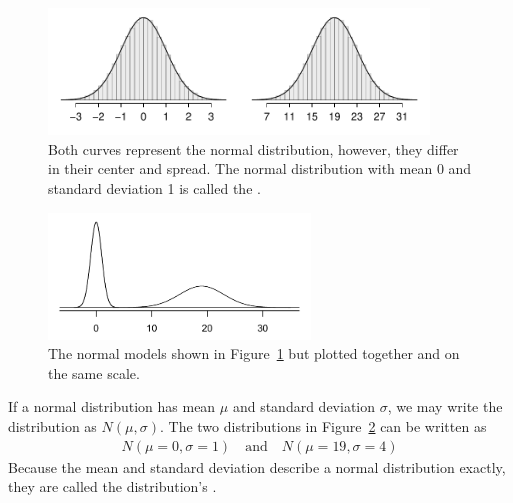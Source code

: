 \begin{figure}[H]
\centering
\includegraphics[width=0.9\textwidth]{03/figures/twoSampleNormals/twoSampleNormals}
\caption{Both curves represent the normal distribution, however, they differ in their center and spread. The normal distribution with mean 0 and standard deviation 1 is called the .}
\label{twoSampleNormals}
\end{figure}



\begin{figure}[H]
\centering
\includegraphics[width=0.62\textwidth]{03/figures/twoSampleNormalsStacked/twoSampleNormalsStacked}
\caption{The normal models shown in Figure~\ref{twoSampleNormals} but plotted together and on the same scale.}
\label{twoSampleNormalsStacked}
\end{figure}

If a normal distribution has mean $\mu$ and standard deviation $\sigma$, we may write the distribution as $N(\mu, \sigma)$. The two distributions in Figure~\ref{twoSampleNormalsStacked} can be written as
\begin{align*}
N(\mu=0,\sigma=1)\quad\text{and}\quad N(\mu=19,\sigma=4)
\end{align*}
Because the mean and standard deviation describe a normal distribution exactly, they are called the distribution's .

